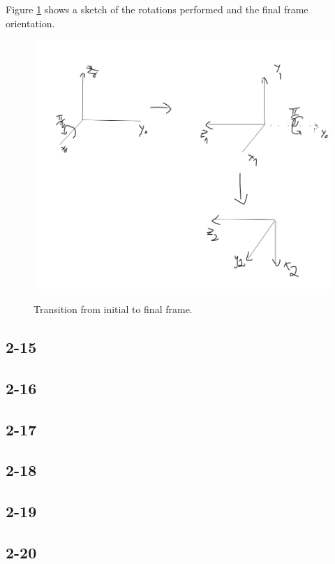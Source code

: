 Figure \ref{fig:ex2_14_sketch} shows a sketch of the rotations performed and the final frame orientation.
\begin{figure}[h]
	\caption{Transition from initial to final frame.}
	\centering
	\includegraphics[scale=0.3]{./chapter02/figures/ex2_14.png}
	\label{fig:ex2_14_sketch}
\end{figure}

\subsection*{2-15}

\subsection*{2-16}

\subsection*{2-17}

\subsection*{2-18}

\subsection*{2-19}

\subsection*{2-20}